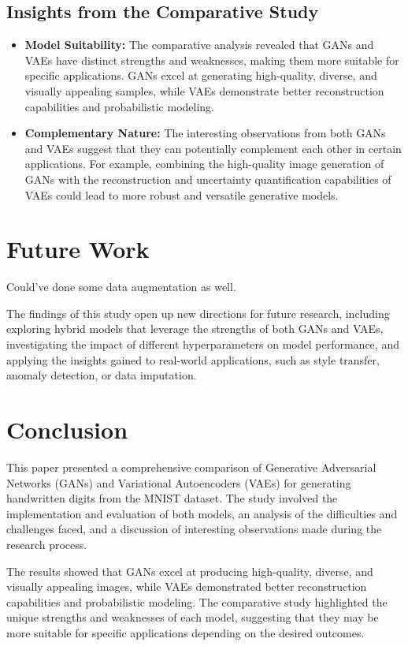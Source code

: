 \documentclass{article}
\begin{document}
\subsection{Insights from the Comparative Study}
\begin{itemize}
    \item \textbf{Model Suitability:} The comparative analysis revealed that GANs and VAEs have distinct strengths and weaknesses, making them more suitable for specific applications. GANs excel at generating high-quality, diverse, and visually appealing samples, while VAEs demonstrate better reconstruction capabilities and probabilistic modeling.
    \item \textbf{Complementary Nature:} The interesting observations from both GANs and VAEs suggest that they can potentially complement each other in certain applications. For example, combining the high-quality image generation of GANs with the reconstruction and uncertainty quantification capabilities of VAEs could lead to more robust and versatile generative models.
\end{itemize}

\section{Future Work}
Could've done some data augmentation as well.

The findings of this study open up new directions for future research, including exploring hybrid models that leverage the strengths of both GANs and VAEs, investigating the impact of different hyperparameters on model performance, and applying the insights gained to real-world applications, such as style transfer, anomaly detection, or data imputation.

\section{Conclusion}
This paper presented a comprehensive comparison of Generative Adversarial Networks (GANs) and Variational Autoencoders (VAEs) for generating handwritten digits from the MNIST dataset. The study involved the implementation and evaluation of both models, an analysis of the difficulties and challenges faced, and a discussion of interesting observations made during the research process.

The results showed that GANs excel at producing high-quality, diverse, and visually appealing images, while VAEs demonstrated better reconstruction capabilities and probabilistic modeling. The comparative study highlighted the unique strengths and weaknesses of each model, suggesting that they may be more suitable for specific applications depending on the desired outcomes.
\end{document}
